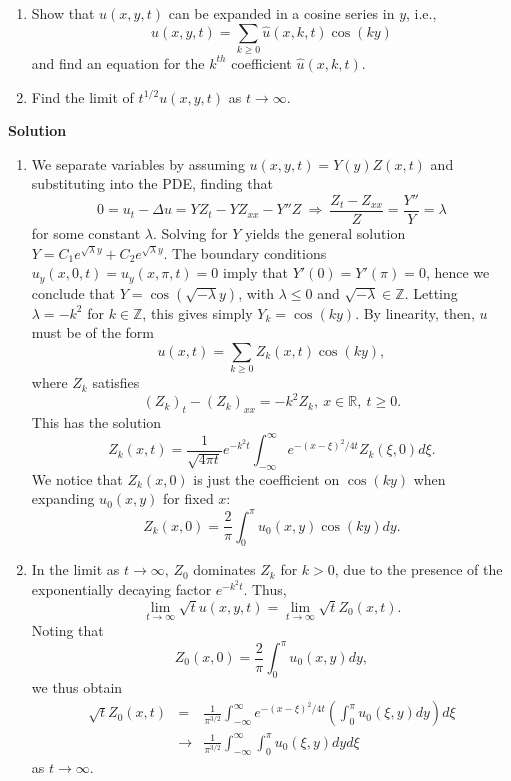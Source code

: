 \documentclass{article}
\begin{document}
\begin{enumerate}
\begin{enumerate}
\item Show that \(u(x,y,t)\) can be expanded in a cosine series in \(y\), i.e.,
\[u(x,y,t) = \sum_{k \geq 0} \widehat{u}(x,k,t) \cos(k y)\]
and find an equation for the \(k^{th}\) coefficient \(\widehat{u}(x,k,t)\).

\item Find the limit of \(t^{1/2} u(x,y,t)\) as \(t \to \infty\).

\end{enumerate}

{\bf Solution}

\begin{enumerate}
\item We separate variables by assuming \(u(x,y,t) = Y(y) Z(x,t)\) and substituting into the PDE, finding that
\[0 = u_t - \Delta u = Y Z_t - Y Z_{xx} - Y'' Z \ \Rightarrow \ \frac{Z_t - Z_{xx}}{Z} = \frac{Y''}{Y} = \lambda\]
for some constant \(\lambda\).  Solving for \(Y\) yields the general solution \(Y = C_1 e^{\sqrt{\lambda} y} + C_2 e^{\sqrt{\lambda} y}\).  The boundary conditions \(u_y(x,0,t) = u_y(x,\pi,t) = 0\) imply that \(Y'(0) = Y'(\pi) = 0\), hence we conclude that \(Y = \cos \left( \sqrt{-\lambda} y \right)\), with \(\lambda \leq 0\) and \(\sqrt{-\lambda} \in \mathbb{Z}\).  Letting \(\lambda = -k^2\) for \(k \in \mathbb{Z}\), this gives simply \(Y_k = \cos(k y)\).  By linearity, then, \(u\) must be of the form
\[u(x,t) = \sum_{k \geq 0} Z_k(x,t) \cos(k y),\]
where \(Z_k\) satisfies
\[(Z_k)_t - (Z_k)_{xx} = -k^2 Z_k, \ x \in \mathbb{R}, \ t \geq 0.\]
This has the solution
\[Z_k(x,t) = \frac{1}{\sqrt{4 \pi t}} e^{-k^2 t} \int_{-\infty}^{\infty} e^{-(x - \xi)^2 / 4 t} Z_k(\xi,0) d\xi.\]
We notice that \(Z_k(x,0)\) is just the coefficient on \(\cos(k y)\) when expanding \(u_0(x,y)\) for fixed \(x\):
\[Z_k(x,0) = \frac{2}{\pi} \int_0^{\pi} u_0(x,y) \cos(k y) dy.\]

\item In the limit as \(t \to \infty\), \(Z_0\) dominates \(Z_k\) for \(k > 0\), due to the presence of the exponentially decaying factor \(e^{-k^2 t}\).  Thus,
\[\lim_{t \to \infty} \sqrt{t} u(x,y,t) = \lim_{t \to \infty} \sqrt{t} Z_0(x,t).\]
Noting that
\[Z_0(x,0) = \frac{2}{\pi} \int_0^{\pi} u_0(x,y) dy,\]
we thus obtain
\begin{eqnarray*}
\sqrt{t} Z_0(x,t)
&  =  & \frac{1}{\pi^{3/2}} \int_{-\infty}^{\infty} e^{-(x - \xi)^2 / 4 t} \left( \int_0^{\pi} u_0(\xi,y) dy \right) d\xi \\
& \to & \frac{1}{\pi^{3/2}} \int_{-\infty}^{\infty} \int_0^{\pi} u_0(\xi,y) dy d\xi
\end{eqnarray*}
as \(t \to \infty\).


\end{enumerate}
\end{enumerate}
\end{document}

